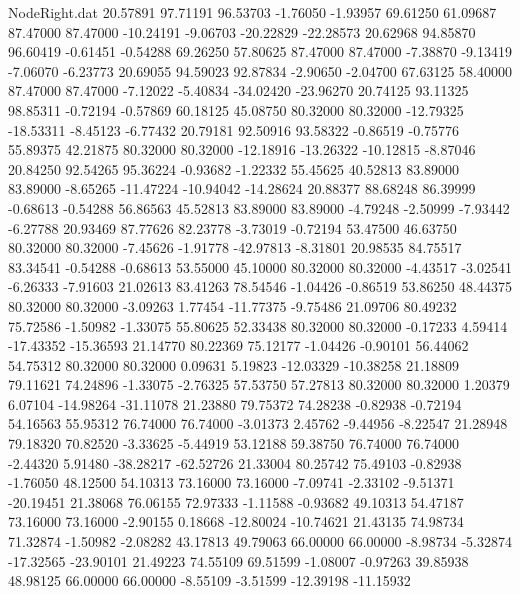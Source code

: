 \begin{filecontents}{NodeRight.dat}
  20.57891   97.71191   96.53703    -1.76050   -1.93957   69.61250   61.09687   87.47000   87.47000  -10.24191   -9.06703  -20.22829  -22.28573
  20.62968   94.85870   96.60419    -0.61451   -0.54288   69.26250   57.80625   87.47000   87.47000   -7.38870   -9.13419   -7.06070   -6.23773
  20.69055   94.59023   92.87834    -2.90650   -2.04700   67.63125   58.40000   87.47000   87.47000   -7.12022   -5.40834  -34.02420  -23.96270
  20.74125   93.11325   98.85311    -0.72194   -0.57869   60.18125   45.08750   80.32000   80.32000  -12.79325  -18.53311   -8.45123   -6.77432
  20.79181   92.50916   93.58322    -0.86519   -0.75776   55.89375   42.21875   80.32000   80.32000  -12.18916  -13.26322  -10.12815   -8.87046
  20.84250   92.54265   95.36224    -0.93682   -1.22332   55.45625   40.52813   83.89000   83.89000   -8.65265  -11.47224  -10.94042  -14.28624
  20.88377   88.68248   86.39999    -0.68613   -0.54288   56.86563   45.52813   83.89000   83.89000   -4.79248   -2.50999   -7.93442   -6.27788
  20.93469   87.77626   82.23778    -3.73019   -0.72194   53.47500   46.63750   80.32000   80.32000   -7.45626   -1.91778  -42.97813   -8.31801
  20.98535   84.75517   83.34541    -0.54288   -0.68613   53.55000   45.10000   80.32000   80.32000   -4.43517   -3.02541   -6.26333   -7.91603
  21.02613   83.41263   78.54546    -1.04426   -0.86519   53.86250   48.44375   80.32000   80.32000   -3.09263    1.77454  -11.77375   -9.75486
  21.09706   80.49232   75.72586    -1.50982   -1.33075   55.80625   52.33438   80.32000   80.32000   -0.17233    4.59414  -17.43352  -15.36593
  21.14770   80.22369   75.12177    -1.04426   -0.90101   56.44062   54.75312   80.32000   80.32000    0.09631    5.19823  -12.03329  -10.38258
  21.18809   79.11621   74.24896    -1.33075   -2.76325   57.53750   57.27813   80.32000   80.32000    1.20379    6.07104  -14.98264  -31.11078
  21.23880   79.75372   74.28238    -0.82938   -0.72194   54.16563   55.95312   76.74000   76.74000   -3.01373    2.45762   -9.44956   -8.22547
  21.28948   79.18320   70.82520    -3.33625   -5.44919   53.12188   59.38750   76.74000   76.74000   -2.44320    5.91480  -38.28217  -62.52726
  21.33004   80.25742   75.49103    -0.82938   -1.76050   48.12500   54.10313   73.16000   73.16000   -7.09741   -2.33102   -9.51371  -20.19451
  21.38068   76.06155   72.97333    -1.11588   -0.93682   49.10313   54.47187   73.16000   73.16000   -2.90155    0.18668  -12.80024  -10.74621
  21.43135   74.98734   71.32874    -1.50982   -2.08282   43.17813   49.79063   66.00000   66.00000   -8.98734   -5.32874  -17.32565  -23.90101
  21.49223   74.55109   69.51599    -1.08007   -0.97263   39.85938   48.98125   66.00000   66.00000   -8.55109   -3.51599  -12.39198  -11.15932

\end{filecontents}
